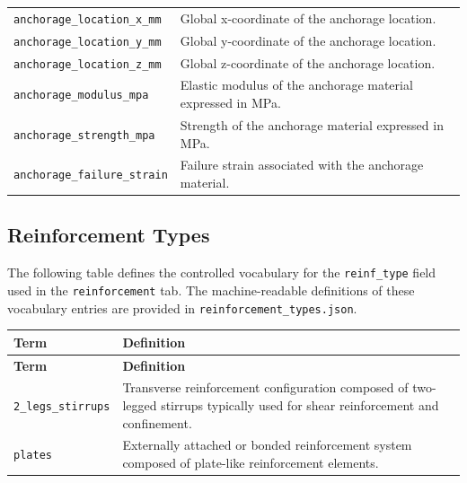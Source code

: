 \documentclass[11pt]{book}
\begin{document}
{\begin{longtable}{p{}p{}}
\texttt{anchorage\_location\_x\_mm} &
Global x-coordinate of the anchorage location. \\

\texttt{anchorage\_location\_y\_mm} &
Global y-coordinate of the anchorage location. \\

\texttt{anchorage\_location\_z\_mm} &
Global z-coordinate of the anchorage location. \\

\texttt{anchorage\_modulus\_mpa} &
Elastic modulus of the anchorage material expressed in MPa. \\

\texttt{anchorage\_strength\_mpa} &
Strength of the anchorage material expressed in MPa. \\

\texttt{anchorage\_failure\_strain} &
Failure strain associated with the anchorage material. \\

\hline
\end{longtable}


\subsection{Reinforcement Types}
\label{vocab:reinforcement_type_list}

The following table defines the controlled vocabulary for the \texttt{reinf\_type} field used in the \texttt{reinforcement} tab. The machine-readable definitions of these vocabulary entries are provided in  \texttt{reinforcement\_types.json}.


\begin{longtable}{p{}p{}}
\hline
\textbf{Term} & \textbf{Definition} \\
\hline
\endfirsthead

\hline
\textbf{Term} & \textbf{Definition} \\
\hline
\endhead

\texttt{2\_legs\_stirrups} &
Transverse reinforcement configuration composed of two-legged stirrups typically used for shear reinforcement and confinement. \\

\texttt{plates} &
Externally attached or bonded reinforcement system composed of plate-like reinforcement elements. \\



\end{longtable}}
\end{document}
